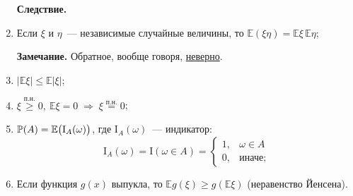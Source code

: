 \begin{namedthm}
\begin{enumerate}
        \textbf{Следствие.}
    
    \item 
        Если $\xi$ и $\eta$~--- независимые случайные величины, то $\mathbb{E}(\xi \eta) = \mathbb{E}\xi \, \mathbb{E}\eta$;
        
        \textbf{Замечание.}
        Обратное, вообще говоря, \hyperlink{counter_exmp_independence}{неверно}.
    \item 
        $\left| \mathbb{E}\xi \right| \leqslant \mathbb{E}|\xi|$;
    
    \item 
        $\xi \overset{\text{п.н.}}{\geqslant} 0, \: \mathbb{E}\xi = 0 \; \Rightarrow \; \xi \overset{\text{п.н.}}{=} 0$;
    
    \item 
        ${\mathbb{P}(A)} = \mathbb{E}\bigl( \mathrm{I}_A(\omega) \bigr)$, где $\mathrm{I}_A(\omega)$~--- индикатор:
        \begin{equation*}
            \mathrm{I}_A(\omega) = \mathrm{I}(\omega \in A) =
            \begin{cases}
            1, & \omega \in A \\
            0, & \text{иначе};
            \end{cases}
        \end{equation*}
        
    \item 
        Если функция $g(x)$ выпукла, то $\mathbb{E}g(\xi) \geqslant g(\mathbb{E}\xi)$ (неравенство Йенсена).
    
\end{enumerate}
\end{namedthm}

